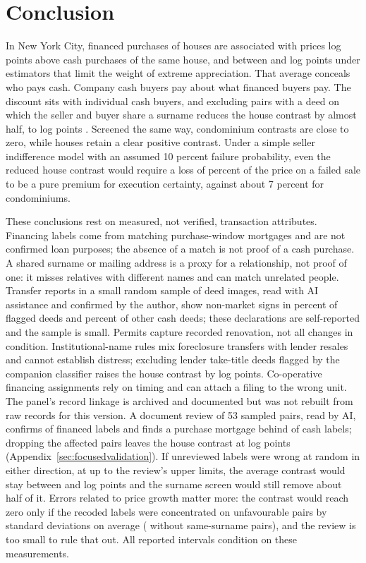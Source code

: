 \documentclass[12pt]{article}
\begin{document}
\section{Conclusion}\label{sec:conclusion}
In New York City, financed purchases of houses are associated with prices \HouseGap{} log points above cash purchases of the same house, and between \RobustMin{} and \RobustMax{} log points under estimators that limit the weight of extreme appreciation. That average conceals who pays cash. Company cash buyers pay about what financed buyers pay. The discount sits with individual cash buyers, and excluding pairs with a deed on which the seller and buyer share a surname reduces the house contrast by almost half, to \NoRelOLS{} log points \NoRelOLSCI{}. Screened the same way, condominium contrasts are close to zero, while houses retain a clear positive contrast. Under a simple seller indifference model with an assumed 10 percent failure probability, even the reduced house contrast would require a loss of \NoRelInvQTen{} percent of the price on a failed sale to be a pure premium for execution certainty, against about 7 percent for condominiums.

These conclusions rest on measured, not verified, transaction attributes. Financing labels come from matching purchase-window mortgages and are not confirmed loan purposes; the absence of a match is not proof of a cash purchase. A shared surname or mailing address is a proxy for a relationship, not proof of one: it misses relatives with different names and can match unrelated people. Transfer reports in a small random sample of deed images, read with AI assistance and confirmed by the author, show non-market signs in \DeedShare{} percent of flagged deeds and \DeedUShare{} percent of other cash deeds; these declarations are self-reported and the sample is small. Permits capture recorded renovation, not all changes in condition. Institutional-name rules mix foreclosure transfers with lender resales and cannot establish distress; excluding lender take-title deeds flagged by the companion classifier raises the house contrast by \NoLegalChange{} log points. Co-operative financing assignments rely on timing and can attach a filing to the wrong unit. The panel's record linkage is archived and documented but was not rebuilt from raw records for this version. A document review of 53 sampled pairs, read by AI, confirms \ReviewFinConfirmed{} of \ReviewFinTotal{} financed labels and finds a purchase mortgage behind \ReviewCashMtg{} of \ReviewCashTotal{} cash labels; dropping the \ReviewErrPairs{} affected pairs leaves the house contrast at \ReviewCorrected{} log points (Appendix~\ref{sec:focusedvalidation}). If unreviewed labels were wrong at random in either direction, at up to the review's upper limits, the average contrast would stay between \MisRandLow{} and \MisRandHigh{} log points and the surname screen would still remove about half of it. Errors related to price growth matter more: the contrast would reach zero only if the recoded labels were concentrated on unfavourable pairs by \MisBreakFull{} standard deviations on average (\MisBreakNoRel{} without same-surname pairs), and the review is too small to rule that out. All reported intervals condition on these measurements.
\end{document}
